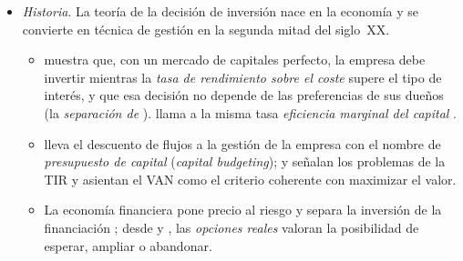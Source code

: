 \documentclass[11pt]{article}
\begin{document}
\begin{itemize}
\begin{itemize}
\begin{itemize}
    \item Los  (terrenos, edificios, máquinas, conocimiento) producen los bienes y servicios: de ellos depende la capacidad productiva de la economía. Los  (acciones, bonos, préstamos) son derechos sobre las rentas que generan los activos reales; no añaden capacidad productiva, sino que reparten esas rentas entre quienes los financian.\footnote{Un activo financiero es siempre, a la vez, el pasivo de otro agente; un activo real no es el pasivo de nadie. Por eso, en el agregado, los activos y los pasivos financieros se compensan y la riqueza de una economía es la de sus activos reales\nocite{BodieKaneMarcus2021Investments}.}
    \item Nos centramos en las \emph{sociedades no financieras} y en su inversión más común, la de activos reales, con una mirada \emph{microeconómica}: no la formación bruta de capital de un país , sino la decisión de una empresa sobre un proyecto concreto.
    \end{itemize}
  \item \emph{Historia}. La teoría de la decisión de inversión nace en la economía y se convierte en técnica de gestión en la segunda mitad del siglo~XX.
    \begin{itemize}
    \item \textcite{Fisher1930Theory} muestra que, con un mercado de capitales perfecto, la empresa debe invertir mientras la \emph{tasa de rendimiento sobre el coste} supere el tipo de interés, y que esa decisión no depende de las preferencias de sus dueños (la \emph{separación de }). \textcite{Keynes1936} llama a la misma tasa \emph{eficiencia marginal del capital} .
    \item \textcite{Dean1951Capital} lleva el descuento de flujos a la gestión de la empresa con el nombre de \emph{presupuesto de capital} (\emph{capital budgeting}); \textcite{LorieSavage1955Three} y \textcite{Hirshleifer1958Optimal} señalan los problemas de la TIR y asientan el VAN como el criterio coherente con maximizar el valor.
    \item La economía financiera pone precio al riesgo\nocite{Markowitz1952Portfolio,Sharpe1964Capital}  y separa la inversión de la financiación\nocite{ModiglianiMiller1958Cost} ; desde \textcite{Myers1977Determinants} y \textcite{DixitPindyck1994}, las \emph{opciones reales} valoran la posibilidad de esperar, ampliar o abandonar.
    \end{itemize}
  \end{itemize}


\end{itemize}
\end{document}
